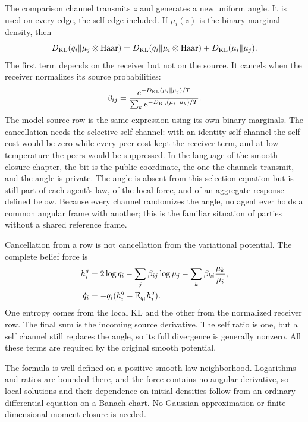 The comparison channel transmits $z$ and generates a new uniform angle. It is used on every edge, the self edge included. If $\mu_i(z)$ is the binary marginal density, then
\begin{equation}
D_{\mathrm{KL}}(q_i\|\mu_j\otimes\mathrm{Haar})
=D_{\mathrm{KL}}(q_i\|\mu_i\otimes\mathrm{Haar})+D_{\mathrm{KL}}(\mu_i\|\mu_j).
\label{co:cost}
\end{equation}
The first term depends on the receiver but not on the source. It cancels when the receiver normalizes its source probabilities:
\begin{equation}
\beta_{ij}=
\frac{e^{-D_{\mathrm{KL}}(\mu_i\|\mu_j)/T}}
{\sum_k e^{-D_{\mathrm{KL}}(\mu_i\|\mu_k)/T}}.
\label{co:row}
\end{equation}
The model source row is the same expression using its own binary marginals. The cancellation needs the selective self channel: with an identity self channel the self cost would be zero while every peer cost kept the receiver term, and at low temperature the peers would be suppressed. In the language of the smooth-closure chapter, the bit is the public coordinate, the one the channels transmit, and the angle is private. The angle is absent from this selection equation but is still part of each agent's law, of the local force, and of an aggregate response defined below. Because every channel randomizes the angle, no agent ever holds a common angular frame with another; this is the familiar situation of parties without a shared reference frame.

Cancellation from a row is not cancellation from the variational potential. The complete belief force is
\begin{equation}
\begin{split}
h_i^q&=2\log q_i-\sum_j\beta_{ij}\log\mu_j
-\sum_k\beta_{ki}\frac{\mu_k}{\mu_i},\\
\dot q_i&=-q_i(h_i^q-\mathbb E_{q_i}h_i^q).
\end{split}
\label{co:force}
\end{equation}
One entropy comes from the local KL and the other from the normalized receiver row. The final sum is the incoming source derivative. The self ratio is one, but a self channel still replaces the angle, so its full divergence is generally nonzero. All these terms are required by the original smooth potential.

The formula is well defined on a positive smooth-law neighborhood. Logarithms and ratios are bounded there, and the force contains no angular derivative, so local solutions and their dependence on initial densities follow from an ordinary differential equation on a Banach chart. No Gaussian approximation or finite-dimensional moment closure is needed.

